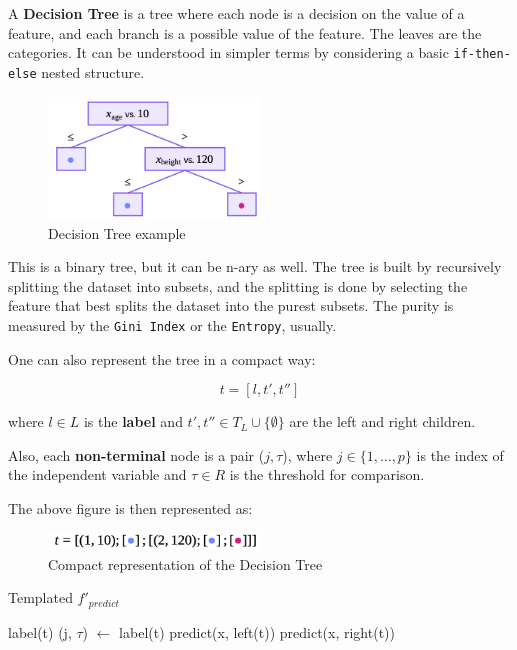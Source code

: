 A \textbf{Decision Tree} is a tree where each node is a decision on the value of a feature, and each branch is a possible value of the feature. The leaves are the categories. It can be understood in simpler terms by considering a basic \texttt{if-then-else} nested structure.


\begin{figure}[H]
    \centering
    \includegraphics[width=0.5\textwidth]{assets/fig11.png}
    \caption{Decision Tree example}
\end{figure}

This is a binary tree, but it can be n-ary as well. The tree is built by recursively splitting the dataset into subsets, and the splitting is done by selecting the feature that best splits the dataset into the purest subsets. The purity is measured by the \texttt{Gini Index} or the \texttt{Entropy}, usually.

One can also represent the tree in a compact way:

$$t = [l, t', t'']$$

where $l \in L$ is the \textbf{label} and $t', t'' \in T_L \cup \{\emptyset\}$ are the left and right children.

Also, each \textbf{non-terminal} node is a pair ($j, \tau$), where $j \in \{1, \dots, p\}$ is the index of the independent variable and $\tau \in R$ is the threshold for comparison.

The above figure is then represented as:

\begin{figure}[H]
    \centering
    \includegraphics[width=0.5\textwidth]{assets/fig12.png}
    \caption{Compact representation of the Decision Tree}
\end{figure}

\begin{algorithm}
    \caption{Templated $f'_{predict}$}
    \begin{algorithmic}[1]
                \State \Return label(t)
            \Else
                \State (j, $\tau$) $\gets$ label(t)
                    \State \Return predict(x, left(t))
                \Else
                    \State \Return predict(x, right(t))
                \EndIf
            \EndIf
        \EndFunction
    \end{algorithmic}
\end{algorithm}

